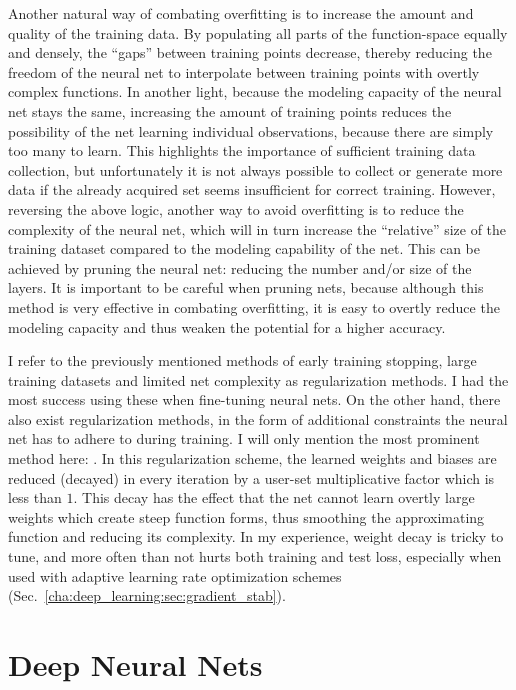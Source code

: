 	 		Another natural way of combating overfitting is to increase the amount and quality of the training data.
	 		By populating all parts of the function-space equally and densely, the ``gaps'' between training points decrease, thereby reducing the freedom of the neural net to interpolate between training points with overtly complex functions.
	 		In another light, because the modeling capacity of the neural net stays the same, increasing the amount of training points reduces the possibility of the net learning individual observations, because there are simply too many to learn.
	 		This highlights the importance of sufficient training data collection, but unfortunately it is not always possible to collect or generate more data if the already acquired set seems insufficient for correct training.
	 		However, reversing the above logic, another way to avoid overfitting is to reduce the complexity of the neural net, which will in turn increase the ``relative'' size of the training dataset compared to the modeling capability of the net.
	 		This can be achieved by pruning the neural net: reducing the number and/or size of the layers.
	 		It is important to be careful when pruning nets, because although this method is very effective in combating overfitting, it is easy to overtly reduce the modeling capacity and thus weaken the potential for a higher accuracy.
	 		
	 		I refer to the previously mentioned methods of early training stopping, large training datasets and limited net complexity as  regularization methods.
	 		I had the most success using these when fine-tuning neural nets.
	 		On the other hand, there also exist  regularization methods, in the form of additional constraints the neural net has to adhere to during training.
	 		I will only mention the most prominent method here: .
	 		In this regularization scheme, the learned weights and biases are reduced (decayed) in every iteration by a user-set multiplicative factor which is less than $1$.
	 		This decay has the effect that the net cannot learn overtly large weights which create steep function forms, thus smoothing the approximating function and reducing its complexity.
	 		In my experience, weight decay is tricky to tune, and more often than not hurts both training and test loss, especially when used with adaptive learning rate optimization schemes (Sec.~\ref{cha:deep_learning:sec:gradient_stab}).
			
	\section{Deep Neural Nets}
	
